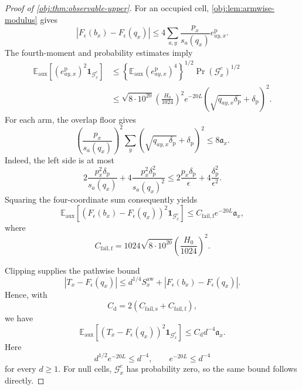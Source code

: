 \begin{proof}[Proof of \cref{obj:thm:observable-upper}]
For an occupied cell, \cref{obj:lem:armwise-modulus} gives
\[
|F_\epsilon(b_x)-F_\epsilon(q_x)|
\le
4\sum_{a,y}\frac{p_x}{s_a(q_x)}e_{ay,x}^{\mathrm p}.
\]
The fourth-moment and probability estimates imply
\[
\begin{aligned}
\mathbb E_{\mathrm{aux}}
[(e_{ay,x}^{\mathrm p})^2\mathbf1_{\mathcal G_x^c}]
&\le
\left\{\mathbb E_{\mathrm{aux}}(e_{ay,x}^{\mathrm p})^4\right\}^{1/2}
\Pr(\mathcal G_x^c)^{1/2}\\
&\le
\sqrt{8\cdot10^{20}}
\left(\frac{H_0}{1024}\right)^2
e^{-20L}
\left(\sqrt{q_{ay,x}\delta_{\mathrm p}}+\delta_{\mathrm p}\right)^2.
\end{aligned}
\]
For each arm, the overlap floor gives
\[
\left(\frac{p_x}{s_a(q_x)}\right)^2
\sum_y
\left(\sqrt{q_{ay,x}\delta_{\mathrm p}}+\delta_{\mathrm p}\right)^2
\le8\mathfrak a_x.
\]
Indeed, the left side is at most
\[
2\frac{p_x^2\delta_{\mathrm p}}{s_a(q_x)}
+
4\frac{p_x^2\delta_{\mathrm p}^2}{s_a(q_x)^2}
\le
2\frac{p_x\delta_{\mathrm p}}{\epsilon}
+
4\frac{\delta_{\mathrm p}^2}{\epsilon^2}.
\]
Squaring the four-coordinate sum consequently yields
\[
\mathbb E_{\mathrm{aux}}
[(F_\epsilon(b_x)-F_\epsilon(q_x))^2\mathbf1_{\mathcal G_x^c}]
\le C_{\mathrm{fail,f}}e^{-20L}\mathfrak a_x,
\]
where
\[
C_{\mathrm{fail,f}}
=
1024\sqrt{8\cdot10^{20}}
\left(\frac{H_0}{1024}\right)^2.
\]

Clipping supplies the pathwise bound
\[
|T_x-F_\epsilon(q_x)|
\le
d^{1/4}S_x^{\mathrm{aw}}
+
|F_\epsilon(b_x)-F_\epsilon(q_x)|.
\]
Hence, with
\[
C_{\mathrm d}=2(C_{\mathrm{fail,s}}+C_{\mathrm{fail,f}}),
\]
we have
\[
\mathbb E_{\mathrm{aux}}
[(T_x-F_\epsilon(q_x))^2\mathbf1_{\mathcal G_x^c}]
\le C_{\mathrm d}d^{-4}\mathfrak a_x.
\]
Here
\[
d^{1/2}e^{-20L}\le d^{-4},
\qquad e^{-20L}\le d^{-4}
\]
for every \(d\ge1\). For null cells, \(\mathcal G_x^c\) has probability zero, so the same bound follows directly.


\end{proof}
